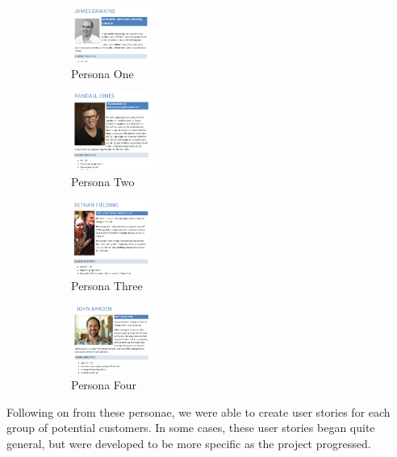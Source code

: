 \documentclass[10pt, a4paper]{article}
\begin{document}
\begin{figure}[h]
        \centering
        \begin{subfigure}[b]{0.4\textwidth}
                \centering
                \includegraphics[width=100px]{images/Persona_1.png}
                \caption{Persona One}
        \end{subfigure}
        \quad %
        \begin{subfigure}[b]{0.4\textwidth}
                \centering
                \includegraphics[width=100px]{images/Persona_2.png}
                \caption{Persona Two}
        \end{subfigure}
        \quad
        \begin{subfigure}[b]{0.4\textwidth}
                \centering
                \includegraphics[width=100px]{images/Persona_3.png}
                \caption{Persona Three}
        \end{subfigure}
        \quad
        \begin{subfigure}[b]{0.4\textwidth}
                \centering
                \includegraphics[width=100px]{images/Persona_4.png}
                \caption{Persona Four}
        \end{subfigure}
        \caption{}
\end{figure}

Following on from these personae, we were able to create user stories for each group of potential customers. In some cases, these user stories began quite general, but were developed to be more specific as the project progressed. 
\end{document}
